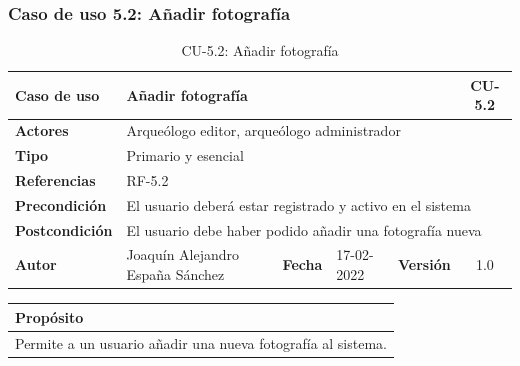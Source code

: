\subsubsection{Caso de uso 5.2: Añadir fotografía}

    \begin{table}[H]
    \begin{center}
        \begin{adjustbox}{width=\textwidth}
        \begin{tabular}{ | l | l | l | l | c | c | } 
            \hline
            \textbf{Caso de uso} & \multicolumn{4}{l|}{Añadir fotografía} & \cellcolor{gray!50} \textbf{CU-5.2}\\
            \hline
            \textbf{Actores} & \multicolumn{5}{p{0.9\linewidth}|}{Arqueólogo editor, arqueólogo administrador} \\
            \hline
            \textbf{Tipo} & \multicolumn{5}{l|}{Primario y esencial} \\
            \hline
            \textbf{Referencias} & \multicolumn{3}{l|}{RF-5.2} & \multicolumn{2}{l|}{ }\\
            \hline
            \textbf{Precondición} & \multicolumn{5}{l|}{El usuario deberá estar registrado y activo en el sistema} \\
            \hline
            \textbf{Postcondición} & \multicolumn{5}{l|}{El usuario debe haber podido añadir una fotografía nueva} \\
            \hline
            \textbf{Autor} & \multicolumn{1}{p{0.25\linewidth}|}{Joaquín Alejandro España Sánchez} & \textbf{Fecha} & 
            17-02-2022     & \textbf{Versión}                                                      & 1.0\\
            \hline
        \end{tabular}
        \end{adjustbox}
        \caption{CU-5.2: Añadir fotografía}
        \label{tab:add-photo}
    \end{center}
    \end{table}

    \begin{table}[H]
        \centering
        \begin{tabularx}{\textwidth}{@{} |L |@{}} \hline
            \textbf{Propósito} \\
            \hline
            Permite a un usuario añadir una nueva fotografía al sistema. \\
            \hline
        \end{tabularx}
    \end{table}

